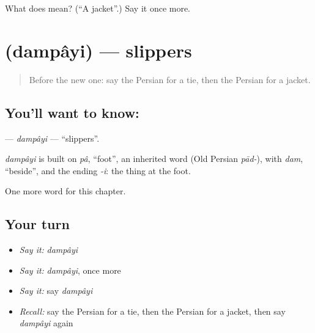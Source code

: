 \begin{tcolorbox}[breakable,colback=teal!4,colframe=teal!35!black,title={Before you move on}]
What does  mean? (\textquotedblleft{}A jacket\textquotedblright{}.) Say it once more.
\end{tcolorbox}
\section[\texorpdfstring{\fa{دمپایی} (dampâyi)}{دمپایی (dampâyi)}]{ (dampâyi) — slippers}

\label{lesson:FA-C120-dampayi}



\begin{quote}
Before the new one: say the Persian for a tie, then the Persian for a jacket.
\end{quote}

\subsection*{You'll want to know: }
\textbf{} — \emph{dampâyi} — \textquotedblleft{}slippers\textquotedblright{}.

\begin{cousinweb}
\emph{dampâyi} is built on \emph{pâ}, \textquotedblleft{}foot\textquotedblright{}, an inherited word (Old Persian \emph{pād-}), with \emph{dam}, \textquotedblleft{}beside\textquotedblright{}, and the ending \emph{-i}: the thing at the foot.
\end{cousinweb}

\begin{grammarlens}[title={What you've built}]
One more word for this chapter.
\end{grammarlens}

\subsection*{Your turn}
\begin{itemize}
\raggedright
  \item \emph{Say it:} \emph{dampâyi}
  \item \emph{Say it:} \emph{dampâyi}, once more
  \item \emph{Say it:} say \emph{dampâyi}
  \item \emph{Recall:} say the Persian for a tie, then the Persian for a jacket, then say \emph{dampâyi} again
\end{itemize}

